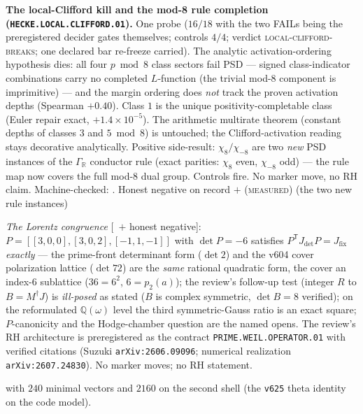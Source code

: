 \par\smallskip\noindent\textbf{The local-Clifford kill and the
mod-8 rule completion (\texttt{HECKE.LOCAL.CLIFFORD.01}).}
One probe ($16/18$ with the two FAILs being the preregistered
decider gates themselves; controls $4/4$; verdict
\textsc{local-clifford-breaks}; one declared bar re-freeze
carried).  The analytic activation-ordering hypothesis dies: all
four $p\bmod8$ class sectors fail PSD --- signed class-indicator
combinations carry no completed $L$-function (the trivial mod-8
component is imprimitive) --- and the margin ordering does
\emph{not} track the proven activation depths (Spearman $+0.40$).
Class $1$ is the unique positivity-completable class (Euler repair
exact, $+1.4\times10^{-5}$).  The arithmetic multirate theorem
(constant depths of classes $3$ and $5\bmod8$) is untouched; the
Clifford-activation reading stays decorative analytically.
Positive side-result: $\chi_8/\chi_{-8}$ are two \emph{new} PSD
instances of the $\Gamma_{\mathbb R}$ conductor rule (exact
parities: $\chi_8$ even, $\chi_{-8}$ odd) --- the rule map now
covers the full mod-8 dual group.  Controls fire.  No marker move,
no RH claim.
Machine-checked: .
Honest negative on record $+$ (\textsc{measured}) (the two new rule
instances)
\par\smallskip



  \emph{The Lorentz congruence}
[\mE\ $+$ honest negative]: $P=[[3,0,0],[3,0,2],[-1,1,-1]]$ with
$\det P=-6$ satisfies $P^{\mathsf T}J_{\mathrm{det}}P=
J_{\mathrm{fix}}$ \emph{exactly} --- the prime-front determinant
form ($\det 2$) and the v604 cover polarization lattice ($\det 72$)
are the \emph{same} rational quadratic form, the cover an index-6
sublattice ($36=6^2$, $6=p_2(a)$); the review's follow-up test
(integer $R$ to $B=M^\dagger J$) is \emph{ill-posed} as stated ($B$
is complex symmetric, $\det B=8$ verified); on the reformulated
$\mathbb Q(\omega)$ level the third symmetric-Gauss ratio is an
exact square; $P$-canonicity and the Hodge-chamber question are the
named opens.  The review's RH architecture is preregistered as the
contract \texttt{PRIME.WEIL.OPERATOR.01} with verified citations
(Suzuki \texttt{arXiv:2606.09096}; numerical realization
\texttt{arXiv:2607.24830}).  No marker moves; no RH statement.


with $240$ minimal vectors and $2160$ on the second shell (the
\texttt{v625} theta identity on the code model).

